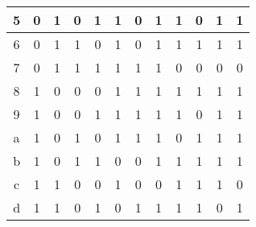 \begin{table}[!h]
\begin{tabular}{|c|cccc|ccccccc|}
		5                      & \multicolumn{1}{c|}{0}  & \multicolumn{1}{c|}{1}  & \multicolumn{1}{c|}{0}  & 1  & \multicolumn{1}{c|}{1} & \multicolumn{1}{c|}{0} & \multicolumn{1}{c|}{1} & \multicolumn{1}{c|}{1} & \multicolumn{1}{c|}{0} & \multicolumn{1}{c|}{1} & 1 \\ \hline
		6                      & \multicolumn{1}{c|}{0}  & \multicolumn{1}{c|}{1}  & \multicolumn{1}{c|}{1}  & 0  & \multicolumn{1}{c|}{1} & \multicolumn{1}{c|}{0} & \multicolumn{1}{c|}{1} & \multicolumn{1}{c|}{1} & \multicolumn{1}{c|}{1} & \multicolumn{1}{c|}{1} & 1 \\ \hline
		7                      & \multicolumn{1}{c|}{0}  & \multicolumn{1}{c|}{1}  & \multicolumn{1}{c|}{1}  & 1  & \multicolumn{1}{c|}{1} & \multicolumn{1}{c|}{1} & \multicolumn{1}{c|}{1} & \multicolumn{1}{c|}{0} & \multicolumn{1}{c|}{0} & \multicolumn{1}{c|}{0} & 0 \\ \hline
		8                      & \multicolumn{1}{c|}{1}  & \multicolumn{1}{c|}{0}  & \multicolumn{1}{c|}{0}  & 0  & \multicolumn{1}{c|}{1} & \multicolumn{1}{c|}{1} & \multicolumn{1}{c|}{1} & \multicolumn{1}{c|}{1} & \multicolumn{1}{c|}{1} & \multicolumn{1}{c|}{1} & 1 \\ \hline
		9                      & \multicolumn{1}{c|}{1}  & \multicolumn{1}{c|}{0}  & \multicolumn{1}{c|}{0}  & 1  & \multicolumn{1}{c|}{1} & \multicolumn{1}{c|}{1} & \multicolumn{1}{c|}{1} & \multicolumn{1}{c|}{1} & \multicolumn{1}{c|}{0} & \multicolumn{1}{c|}{1} & 1 \\ \hline
		a                      & \multicolumn{1}{c|}{1}  & \multicolumn{1}{c|}{0}  & \multicolumn{1}{c|}{1}  & 0  & \multicolumn{1}{c|}{1} & \multicolumn{1}{c|}{1} & \multicolumn{1}{c|}{1} & \multicolumn{1}{c|}{0} & \multicolumn{1}{c|}{1} & \multicolumn{1}{c|}{1} & 1 \\ \hline
		b                      & \multicolumn{1}{c|}{1}  & \multicolumn{1}{c|}{0}  & \multicolumn{1}{c|}{1}  & 1  & \multicolumn{1}{c|}{0} & \multicolumn{1}{c|}{0} & \multicolumn{1}{c|}{1} & \multicolumn{1}{c|}{1} & \multicolumn{1}{c|}{1} & \multicolumn{1}{c|}{1} & 1 \\ \hline
		c                      & \multicolumn{1}{c|}{1}  & \multicolumn{1}{c|}{1}  & \multicolumn{1}{c|}{0}  & 0  & \multicolumn{1}{c|}{1} & \multicolumn{1}{c|}{0} & \multicolumn{1}{c|}{0} & \multicolumn{1}{c|}{1} & \multicolumn{1}{c|}{1} & \multicolumn{1}{c|}{1} & 0 \\ \hline
		d                      & \multicolumn{1}{c|}{1}  & \multicolumn{1}{c|}{1}  & \multicolumn{1}{c|}{0}  & 1  & \multicolumn{1}{c|}{0} & \multicolumn{1}{c|}{1} & \multicolumn{1}{c|}{1} & \multicolumn{1}{c|}{1} & \multicolumn{1}{c|}{1} & \multicolumn{1}{c|}{0} & 1 \\ \hline

\end{tabular}
\end{table}
